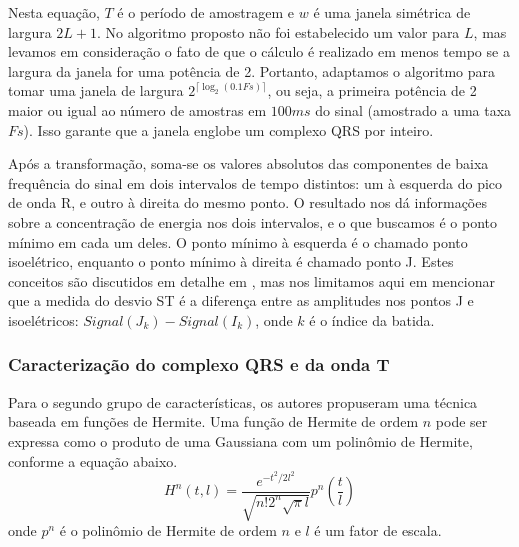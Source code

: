 Nesta equação, $T$ é o período de amostragem e $w$ é uma janela simétrica de largura $2L+1$. No algoritmo proposto não foi estabelecido um valor para $L$, mas levamos em consideração o fato de que o cálculo é realizado em menos tempo se a largura da janela for uma potência de 2. Portanto, adaptamos o algoritmo para tomar uma janela de largura $2^{\lceil\log_2(0.1Fs)\rceil}$, ou seja, a primeira potência de 2 maior ou igual ao número de amostras em $100ms$ do sinal (amostrado a uma taxa $Fs$). Isso garante que a janela englobe um complexo QRS por inteiro.

Após a transformação, soma-se os valores absolutos das componentes de baixa frequência do sinal em dois intervalos de tempo distintos: um à esquerda do pico de onda R, e outro à direita do mesmo ponto. O resultado nos dá informações sobre a concentração de energia nos dois intervalos, e o que buscamos é o ponto mínimo em cada um deles. O ponto mínimo à esquerda é o chamado ponto isoelétrico, enquanto o ponto mínimo à direita é chamado ponto J. Estes conceitos são discutidos em detalhe em \cite{Rocha10}, mas nos limitamos aqui em mencionar que a medida do desvio ST é a diferença entre as amplitudes nos pontos J e isoelétricos: $Signal(J_k) - Signal(I_k)$, onde $k$ é o índice da batida.

\subsubsection{Caracterização do complexo QRS e da onda T}
Para o segundo grupo de características, os autores propuseram uma técnica baseada em funções de Hermite. Uma função de Hermite de ordem $n$ pode ser expressa como o produto de uma Gaussiana com um polinômio de Hermite, conforme a equação abaixo.
\begin{equation} \label{equ:hermite_function}
    H^n(t,l) = \frac{e^{-t^2/2l^2}}{\sqrt{n!2^n\sqrt{\pi}l}}p^n\left(\frac{t}{l}\right)
\end{equation}
onde $p^n$ é o polinômio de Hermite de ordem $n$ e $l$ é um fator de escala.

